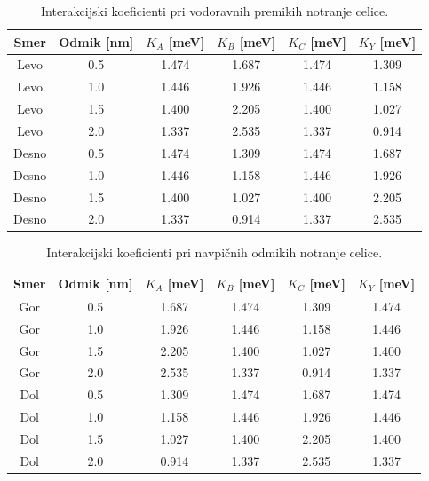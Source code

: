 \documentclass[12pt,a4paper]{article}
\begin{document}
\begin{table}[H]
    \centering
    \caption{Interakcijski koeficienti pri vodoravnih premikih
    notranje celice.}
    \label{g18:tab:energija-vodoravno}
    \begin{tabular}{cccccc}
        \toprule
        Smer &  Odmik [nm] & $K_A$ [meV] & $K_B$ [meV] & $K_C$ [meV] & $K_Y$ [meV] \\
        \midrule
        Levo & 0.5 & 1.474 & 1.687 & 1.474 & 1.309 \\
        Levo & 1.0 & 1.446 & 1.926 & 1.446 & 1.158 \\
        Levo & 1.5 & 1.400 & 2.205 & 1.400 & 1.027 \\
        Levo & 2.0 & 1.337 & 2.535 & 1.337 & 0.914 \\
        \midrule
        Desno & 0.5 & 1.474 & 1.309 & 1.474 & 1.687 \\
        Desno & 1.0 & 1.446 & 1.158 & 1.446 & 1.926 \\
        Desno & 1.5 & 1.400 & 1.027 & 1.400 & 2.205 \\
        Desno & 2.0 & 1.337 & 0.914 & 1.337 & 2.535 \\
        \bottomrule
    \end{tabular}
\end{table}

\begin{table}[H]
    \centering
    \caption{Interakcijski koeficienti pri navpičnih
    odmikih notranje celice.}
    \label{g18:tab:energija-navpicno}
    \begin{tabular}{cccccc}
        \toprule
        Smer & Odmik [nm] & $K_A$ [meV] & $K_B$ [meV] & $K_C$  [meV] & $K_Y$  [meV] \\
        \midrule
        Gor & 0.5 & 1.687 & 1.474 & 1.309 & 1.474 \\
        Gor & 1.0 & 1.926 & 1.446 & 1.158 & 1.446 \\
        Gor & 1.5 & 2.205 & 1.400 & 1.027 & 1.400 \\
        Gor & 2.0 & 2.535 & 1.337 & 0.914 & 1.337 \\
        \midrule
        Dol & 0.5 & 1.309 & 1.474 & 1.687 & 1.474 \\
        Dol & 1.0 & 1.158 & 1.446 & 1.926 & 1.446 \\
        Dol & 1.5 & 1.027 & 1.400 & 2.205 & 1.400 \\
        Dol & 2.0 & 0.914 & 1.337 & 2.535 & 1.337 \\
        \bottomrule
    \end{tabular}
\end{table}
\end{document}
